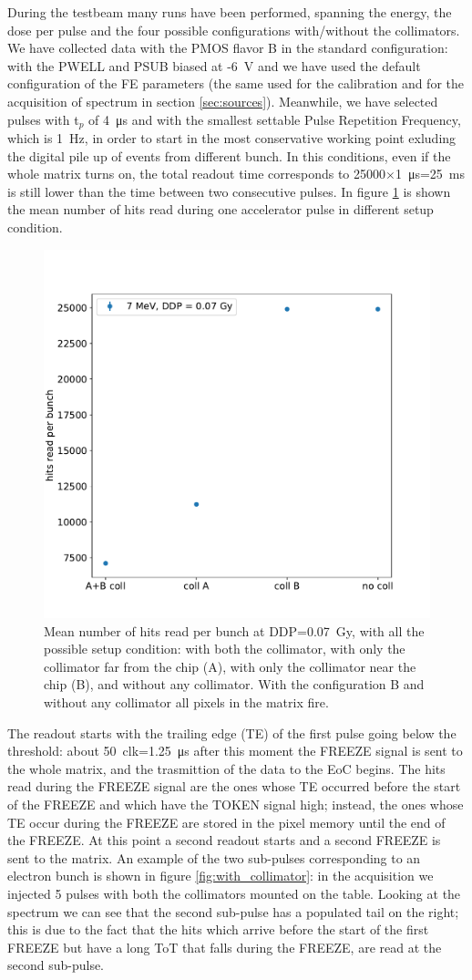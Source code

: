    During the testbeam many runs have been performed, spanning the energy, the dose per pulse and the four possible configurations with/without the collimators. 
   We have collected data with the PMOS flavor B in the standard configuration: with the PWELL and PSUB biased at -\SI{6}{V} and we have used the default configuration of the FE parameters (the same used for the calibration and for the acquisition of spectrum in section \ref{sec:sources}).
   Meanwhile, we have selected pulses with t$_p$ of \SI{4}{\us} and with the smallest settable Pulse Repetition Frequency, which is \SI{1}{Hz}, in order to start in the most conservative working point exluding the digital pile up of events from different bunch. In this conditions, even if the whole matrix turns on, the total readout time corresponds to 25000$\times$\SI{1}{\us}=\SI{25}{ms} is still lower than the time between two consecutive pulses.
   In figure \ref{fig:hits_FLASH} is shown the mean number of hits read during one accelerator pulse in different setup condition.
   \begin{figure}
      \centering
      \includegraphics[width=.49\linewidth]{figures/test_beam/hits.pdf}
      \caption{Mean number of hits read per bunch at DDP=\SI{0.07}{Gy}, with all the possible setup condition: with both the collimator, with only the collimator far from the chip (A), with only the collimator near the chip (B), and without any collimator. With the configuration B and without any collimator all pixels in the matrix fire.}
      \label{fig:hits_FLASH}
   \end{figure}

   The readout starts with the trailing edge (TE) of the first pulse going below the threshold: about \SI{50}{clk}=\SI{1.25}{\us} after this moment the FREEZE signal is sent to the whole matrix, and the trasmittion of the data to the EoC begins.
   The hits read during the FREEZE signal are the ones whose TE occurred before the start of the FREEZE and which have the TOKEN signal high; instead, the ones whose TE occur during the FREEZE are stored in the pixel memory until the end of the FREEZE. At this point a second readout starts and a second FREEZE is sent to the matrix.  
   An example of the two sub-pulses corresponding to an electron bunch is shown in figure \ref{fig:with_collimator}: in the acquisition we injected 5 pulses with both the collimators mounted on the table. 
   Looking at the spectrum we can see that the second sub-pulse has a populated tail on the right; this is due to the fact that the hits which arrive before the start of the first FREEZE but have a long ToT that falls during the FREEZE, are read at the second sub-pulse. 
   
